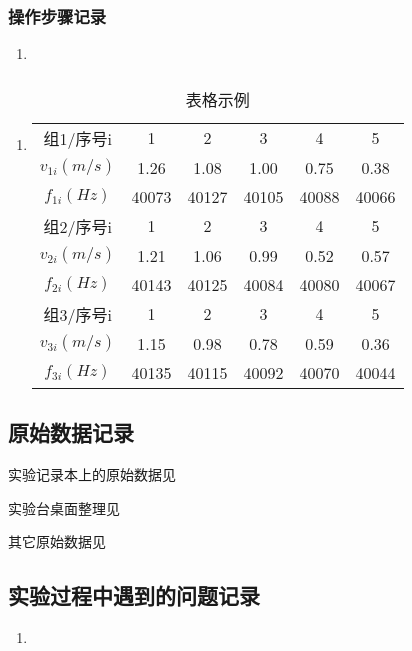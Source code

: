 \documentclass[dvipsnames, svgnames,a4paper,11pt]{article}
\begin{document}
	\subsubsection{操作步骤记录}
	\begin{enumerate}
		\item 
	\end{enumerate}	
	
	\subsubsection{}
	\begin{enumerate}
		\item \begin{table}[h]
			\centering
			\caption{表格示例}
			\label{tab:tab1}
			\begin{tabular}{|c|c|c|c|c|c|}
				\hline
				组1/序号i & 1 & 2 & 3 & 4 & 5 \\
				$v_{1i}(m/s)$ & 1.26 & 1.08 & 1.00 & 0.75 & 0.38 \\
				$f_{1i}(Hz)$ & 40073 & 40127 & 40105 & 40088 & 40066 \\
				\hline
				组2/序号i & 1 & 2 & 3 & 4 & 5 \\
				$v_{2i}(m/s)$ & 1.21 & 1.06 & 0.99 & 0.52 & 0.57 \\
				$f_{2i}(Hz)$ & 40143 & 40125 & 40084 & 40080 & 40067 \\
				\hline
				组3/序号i & 1 & 2 & 3 & 4 & 5 \\
				$v_{3i}(m/s)$ & 1.15 & 0.98 & 0.78 & 0.59 & 0.36 \\
				$f_{3i}(Hz)$ & 40135 & 40115 & 40092 & 40070 & 40044 \\
				\hline
			\end{tabular}
		\end{table}		
	\end{enumerate}
	
	
	\clearpage
	\subsection{原始数据记录}
	实验记录本上的原始数据见%
	
	实验台桌面整理见%
	
	其它原始数据见%
	
	\subsection{实验过程中遇到的问题记录}
	\begin{enumerate}
		\item 
	\end{enumerate}
	
\end{document}
